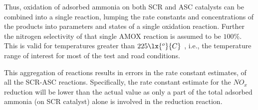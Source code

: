 Thus, oxidation of adsorbed ammonia on both SCR and ASC catalysts can be combined into a single reaction, lumping the
rate constants and concentrations of the products into parameters and states of a single oxidation reaction. Further
the nitrogen selectivity of that single AMOX reaction is assumed to be $100\%$. This is valid for temperatures greater
than $225 \lx{^o}{C}$ \cite{jain2023diagnostics}, i.e., the temperature range of interest for most of the test and road
conditions.

This aggregation of reactions results in errors in the rate constant estimates, of all the SCR-ASC reactions.
Specifically, the rate constant estimate for the $NO_x$ reduction will be lower than the actual value as only a part of
the total adsorbed ammonia (on SCR catalyst) alone is involved in the reduction reaction.
